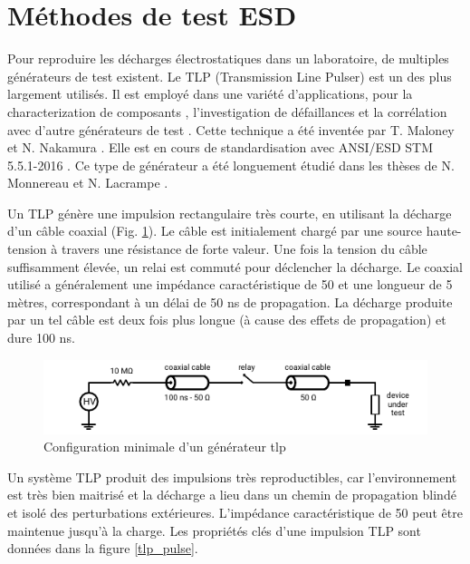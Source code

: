 \section{Méthodes de test ESD}

Pour reproduire les décharges électrostatiques dans un laboratoire, de multiples générateurs de test existent.
Le TLP (Transmission Line Pulser) est un des plus largement utilisés.
Il est employé dans une variété d'applications, pour la characterization de composants \cite{TLPforESDProtectionCz, TLPthroubleshooting}, l'investigation de défaillances \cite{tlp-application-1, tlp-application-2} et la corrélation avec d'autre générateurs de test \cite{correlation-system-level-esd-tlp}.
Cette technique a été inventée par T. Maloney et N. Nakamura \cite{TLP}.
Elle est en cours de standardisation avec ANSI/ESD STM 5.5.1-2016 \cite{tlp-standard}.
Ce type de générateur a été longuement étudié dans les thèses de N. Monnereau \cite{phd-monnereau} et N. Lacrampe \cite{phd-lacrampe}.

Un TLP génère une impulsion rectangulaire très courte, en utilisant la décharge d'un câble coaxial (Fig. \ref{tlp_concept}).
Le câble est initialement chargé par une source haute-tension à travers une résistance de forte valeur.
Une fois la tension du câble suffisamment élevée, un relai est commuté pour déclencher la décharge.
Le coaxial utilisé a généralement une impédance caractéristique de 50\textOmega{} et une longueur de 5 mètres, correspondant à un délai de 50 ns de propagation.
La décharge produite par un tel câble est deux fois plus longue (à cause des effets de propagation) et dure 100 ns.

\begin{figure}[!h]
  \centering
  \includegraphics[width=\textwidth]{src/1/figures/tlp_concept.pdf}
  \caption{Configuration minimale d'un générateur \gls{tlp}}
  \label{tlp_concept}
\end{figure}

Un système TLP produit des impulsions très reproductibles, car l'environnement est très bien maitrisé et la décharge a lieu dans un chemin de propagation blindé et isolé des perturbations extérieures.
L'impédance caractéristique de 50\textOmega{} peut être maintenue jusqu'à la charge.
Les propriétés clés d'une impulsion TLP sont données dans la figure \ref{tlp_pulse}.

